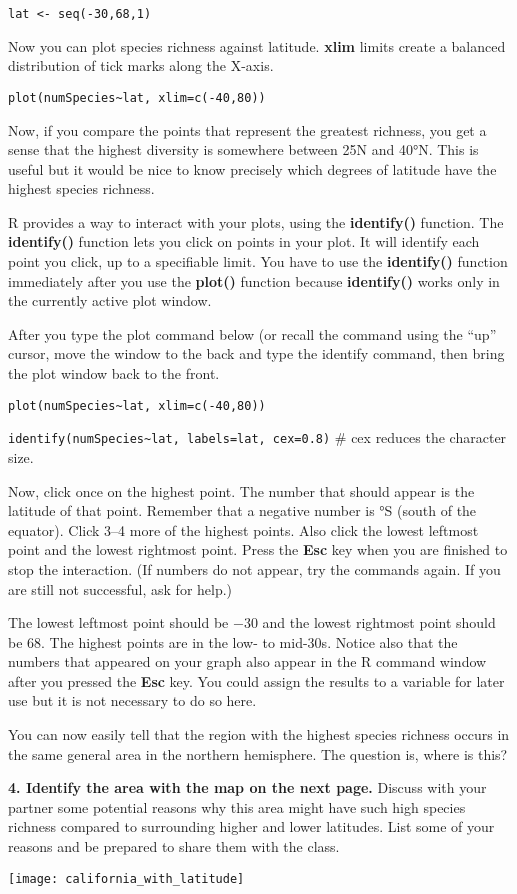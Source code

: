 \documentclass[11pt]{article}
\begin{document}
\texttt{lat <- seq(-30,68,1)}

Now you can plot species richness against latitude. \textbf{xlim{}} limits create a balanced distribution of tick marks along the X-axis.

\texttt{plot(numSpecies\textasciitilde{}lat, xlim=c(-40,80))}

Now, if you compare the points that represent the greatest richness, you
get a sense that the highest diversity is somewhere between 25N and
40°N. This is useful but it would be nice to know precisely which
degrees of latitude have the highest species richness.

R provides a way to interact with your plots, using the
\textbf{identify()} function. The \textbf{identify()} function lets you
click on points in your plot. It will identify each point you click, up
to a specifiable limit. You have to use the \textbf{identify()} function
immediately after you use the \textbf{plot()} function because
\textbf{identify()} works only in the currently active plot window.

After you type the plot command below (or recall the command using
the “up” cursor, move the window to the back and type the identify
command, then bring the plot window back to the front.

\texttt{plot(numSpecies\textasciitilde{}lat, xlim=c(-40,80))}

\texttt{identify(numSpecies\textasciitilde{}lat, labels=lat, cex=0.8)} \qquad \# cex reduces the character size.

Now, click once on the highest point. The number that should appear is the latitude of that point. Remember that a negative number is °S (south of the equator). Click 3–4 more of the highest points. Also click the lowest leftmost point and the
lowest rightmost point. Press the \textbf{Esc} key when you are finished
to stop the interaction. (If numbers do not appear, try the commands again. If you are still not
successful, ask for help.)

The lowest leftmost point should be $\minus$30 and the lowest rightmost point
should be 68. The highest points are in the low- to mid-30s. Notice also that
the numbers that appeared on your graph also appear in the R command
window after you pressed the \textbf{Esc} key. You could assign the
results to a variable for later use but it is not necessary to do so
here.

You can now easily tell that the region with the highest species
richness occurs in the same general area in the northern hemisphere. The
question is, where is this?

\textbf{4. Identify the area with the map on the next page.} Discuss with your
partner some potential reasons why this area might have such high
species richness compared to surrounding higher and lower latitudes.
List some of your reasons and be prepared to share them with the class.

\newpage

\begin{center}
	\texttt{[image: california\_with\_latitude]}
\end{center}
\end{document}
